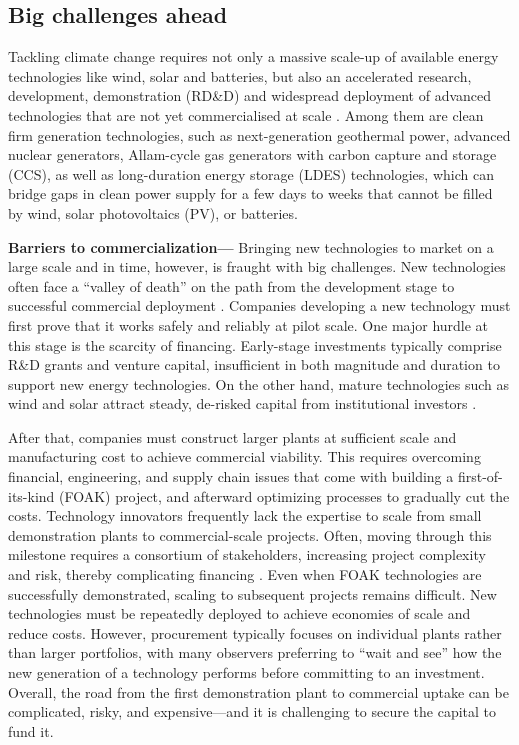 \documentclass[pdflatex,sn-basic, Numbered]{sn-jnl}%
\theoremstyle{thmstyleone}%
\theoremstyle{thmstyletwo}%
\theoremstyle{thmstylethree}%
\begin{document}
\subsection*{Big challenges ahead}\label{sec1}

Tackling climate change requires not only a massive scale-up of available energy technologies like wind, solar and batteries, but also an accelerated research, development, demonstration (RD\&D) and widespread deployment of advanced technologies that are not yet commercialised at scale \cite{sepulvedaRoleFirmLowCarbon2018, bistlineImpactCarbonDioxide2021, brownUltralongdurationEnergyStorage2023, ieaNetZero20502021}.
Among them are clean firm generation technologies, such as next-generation geothermal power, advanced nuclear generators, Allam-cycle gas generators with carbon capture and storage (CCS), as well as long-duration energy storage (LDES) technologies, which can bridge gaps in clean power supply for a few days to weeks that cannot be filled by wind, solar photovoltaics (PV), or batteries.

\textbf{Barriers to commercialization---} Bringing new technologies to market on a large scale and in time, however, is fraught with big challenges.
New technologies often face a \enquote{valley of death} on the path from the development stage to successful commercial deployment \cite{gatesFinancingCleanIndustrial2021, google-advancedtech}.
Companies developing a new technology must first prove that it works safely and reliably at pilot scale.
One major hurdle at this stage is the scarcity of financing. Early-stage investments typically comprise R\&D grants and venture capital, insufficient in both magnitude and duration to support new energy technologies. On the other hand, mature technologies such as wind and solar attract steady, de-risked capital from institutional investors \cite{google-advancedtech, khatcherianBarriersTimelyDeployment2022}.

After that, companies must construct larger plants at sufficient scale and manufacturing cost to achieve commercial viability. This requires overcoming financial, engineering, and supply chain issues that come with building a first-of-its-kind (FOAK) project, and afterward optimizing processes to gradually cut the costs. Technology innovators frequently lack the expertise to scale from small demonstration plants to commercial-scale projects. Often, moving through this milestone requires a consortium of stakeholders, increasing project complexity and risk, thereby complicating financing \cite{google-advancedtech}.
Even when FOAK technologies are successfully demonstrated, scaling to subsequent projects remains difficult. New technologies must be repeatedly deployed to achieve economies of scale and reduce costs. However, procurement typically focuses on individual plants rather than larger portfolios, with many observers preferring to \enquote{wait and see} how the new generation of a technology performs before committing to an investment. Overall, the road from the first demonstration plant to commercial uptake can be complicated, risky, and expensive---and it is challenging to secure the capital to fund it.
\end{document}
